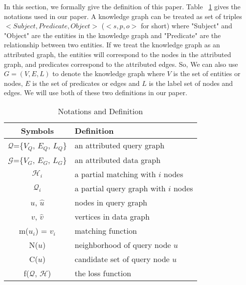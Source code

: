 In this section, we formally give the definition of this paper. Table ~\ref{table1} gives the notations used in our paper.
A knowledge graph can be treated as set of triples $<Subject, Predicate, Object>$ ($<s, p, o>$ for short) where "Subject" and "Object" are the entities in the knowledge graph and "Predicate" are the relationship between two entities. If we treat the knowledge graph as an attributed graph, the entities will correspond to the nodes in the attributed graph, and predicates correspond to the attributed edges. So, We can also use $G=(V, E, L)$ to denote the knowledge graph where $V$ is the set of entities or nodes, $E$ is the set of predicates or edges and $L$ is the label set of nodes and edges. We will use both of these two definitions in our paper.


\begin{table}[]
	\centering
	\caption{Notations and Definition}
	\vspace{-0.5\baselineskip}
	\begin{tabular}{|c|l|}
		\hline
		Symbols       & Definition                \\ \hline
		$\mathcal{Q}$=\{$V_Q$, $E_Q$, $L_Q$\} & an attributed query graph \\ \hline
		$\mathcal{G}$=\{$V_G$, $E_G$, $L_G$\} & an attributed data graph  \\ \hline
		$\mathcal{H}_{i}$         & a partial matching with $i$ nodes \\ \hline
		$\mathcal{Q}_{i}$         & a partial query graph with $i$ nodes \\ \hline
		$u$, $\hat{u}$      & nodes in query graph      \\ \hline
		$v$, $\hat{v}$      & vertices in data graph       \\ \hline
		m($u_i$) = $v_i$ & matching function       \\ \hline
		N($u$)          & neighborhood of query node $u$  \\ \hline
		C($u$)          & candidate set of query node $u$  \\ \hline
		f($\mathcal{Q}$, $\mathcal{H}$)          & the loss function     \\ \hline
	\end{tabular}
\label{table1}
\vspace{-0.8\baselineskip}
\end{table}